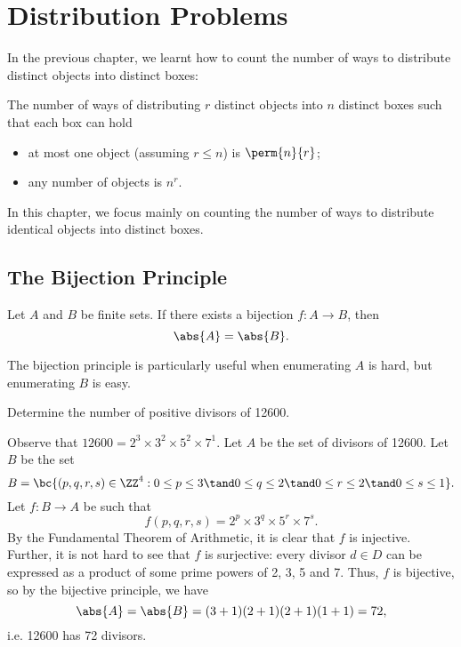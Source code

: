 \chapter{Distribution Problems}

In the previous chapter, we learnt how to count the number of ways to distribute distinct objects into distinct boxes:

\begin{proposition}
    The number of ways of distributing $r$ distinct objects into $n$ distinct boxes such that each box can hold
    \begin{itemize}
        \item at most one object (assuming $r \leq n$) is $\perm{n}{r}$;
        \item any number of objects is $n^r$.
    \end{itemize}
\end{proposition}

In this chapter, we focus mainly on counting the number of ways to distribute identical objects into distinct boxes.

\section{The Bijection Principle}

\begin{theorem}
    Let $A$ and $B$ be finite sets. If there exists a bijection $f: A \to B$, then \[\abs{A} = \abs{B}.\]
\end{theorem}

The bijection principle is particularly useful when enumerating $A$ is hard, but enumerating $B$ is easy.

\begin{sample}
    Determine the number of positive divisors of 12600.
\end{sample}
\begin{sampans}
    Observe that $12600 = 2^3 \times 3^2 \times 5^2 \times 7^1$. Let $A$ be the set of divisors of 12600. Let $B$ be the set \[B = \bc{(p,q,r,s) \in \ZZ^4 : 0 \leq p \leq 3 \tand 0 \leq q \leq 2 \tand 0 \leq r \leq 2 \tand 0 \leq s \leq 1}.\] Let $f : B \to A$ be such that \[f(p,q,r,s) = 2^p \times 3^q \times 5^r \times 7^s.\] By the Fundamental Theorem of Arithmetic, it is clear that $f$ is injective. Further, it is not hard to see that $f$ is surjective: every divisor $d \in D$ can be expressed as a product of some prime powers of 2, 3, 5 and 7. Thus, $f$ is bijective, so by the bijective principle, we have \[\abs{A} = \abs{B} = (3+1)(2+1)(2+1)(1+1) = 72,\] i.e. 12600 has 72 divisors.
\end{sampans}

